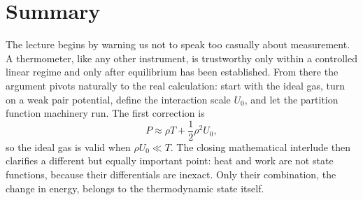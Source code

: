 \section{Summary}

The lecture begins by warning us not to speak too casually about measurement. A thermometer, like any other instrument, is trustworthy only within a controlled linear regime and only after equilibrium has been established. From there the argument pivots naturally to the real calculation: start with the ideal gas, turn on a weak pair potential, define the interaction scale \(U_0\), and let the partition function machinery run. The first correction is
\begin{equation}
P\approx \rho T+\frac{1}{2}\rho^2U_0,
\end{equation}
so the ideal gas is valid when \(\rho U_0\ll T\). The closing mathematical interlude then clarifies a different but equally important point: heat and work are not state functions, because their differentials are inexact. Only their combination, the change in energy, belongs to the thermodynamic state itself.